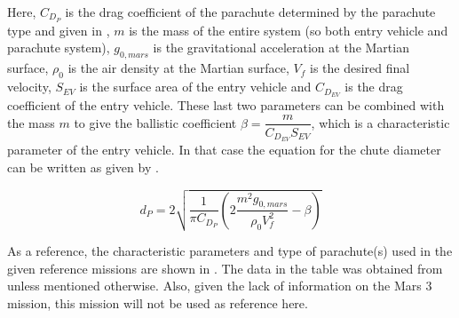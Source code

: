 
Here, $C_{D_{P}}$ is the drag coefficient of the parachute determined by the parachute type and given in \cite{ewing1978}, $m$ is the mass of the entire system (so both entry vehicle and parachute system), $g_{0,mars}$ is the gravitational acceleration at the Martian surface, $\rho_{0}$ is the air density at the Martian surface, $V_{f}$ is the desired final velocity, $S_{EV}$ is the surface area of the entry vehicle and $C_{D_{EV}}$ is the drag coefficient of the entry vehicle. These last two parameters can be combined with the mass $m$ to give the ballistic coefficient $\beta=\dfrac{m}{C_{D_{EV}}S_{EV}}$, which is a characteristic parameter of the entry vehicle. In that case the equation for the chute diameter can be written as given by .

\begin{equation}\label{eq:chutediambeta}
d_{P}=2\sqrt{\dfrac{1}{\pi C_{D_{P}}}\left(2\dfrac{m^{2}g_{0,mars}}{\rho_{0}V_{f}^{2}}-\beta\right)}
\end{equation}

As a reference, the characteristic parameters and type of parachute(s) used in the given reference missions are shown in . The data in the table was obtained from \cite{braun2006,cruz2006} unless mentioned otherwise. Also, given the lack of information on the Mars 3 mission, this mission will not be used as reference here.

